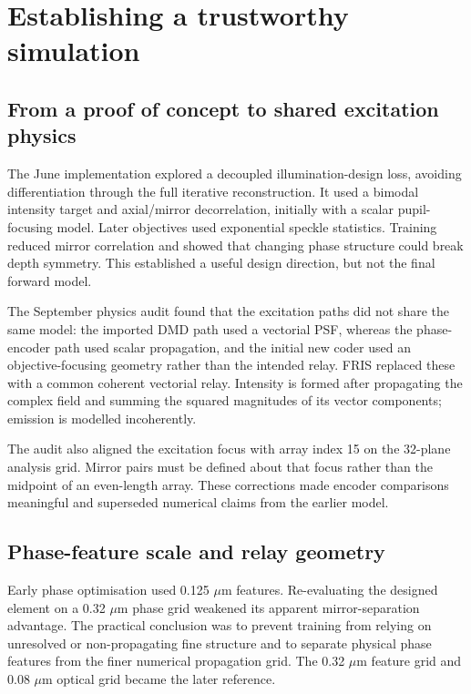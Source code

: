 \section{Establishing a trustworthy simulation}

\subsection{From a proof of concept to shared excitation physics}

The June implementation explored a decoupled illumination-design loss, avoiding differentiation through the full iterative reconstruction. It used a bimodal intensity target and axial/mirror decorrelation, initially with a scalar pupil-focusing model. Later objectives used exponential speckle statistics. Training reduced mirror correlation and showed that changing phase structure could break depth symmetry. This established a useful design direction, but not the final forward model.

The September physics audit found that the excitation paths did not share the same model: the imported DMD path used a vectorial PSF, whereas the phase-encoder path used scalar propagation, and the initial new coder used an objective-focusing geometry rather than the intended relay. FRIS replaced these with a common coherent vectorial relay. Intensity is formed after propagating the complex field and summing the squared magnitudes of its vector components; emission is modelled incoherently.

The audit also aligned the excitation focus with array index 15 on the 32-plane analysis grid. Mirror pairs must be defined about that focus rather than the midpoint of an even-length array. These corrections made encoder comparisons meaningful and superseded numerical claims from the earlier model.

\subsection{Phase-feature scale and relay geometry}

Early phase optimisation used 0.125 \ensuremath{\mu}m features. Re-evaluating the designed element on a 0.32 \ensuremath{\mu}m phase grid weakened its apparent mirror-separation advantage. The practical conclusion was to prevent training from relying on unresolved or non-propagating fine structure and to separate physical phase features from the finer numerical propagation grid. The 0.32 \ensuremath{\mu}m feature grid and 0.08 \ensuremath{\mu}m optical grid became the later reference.

